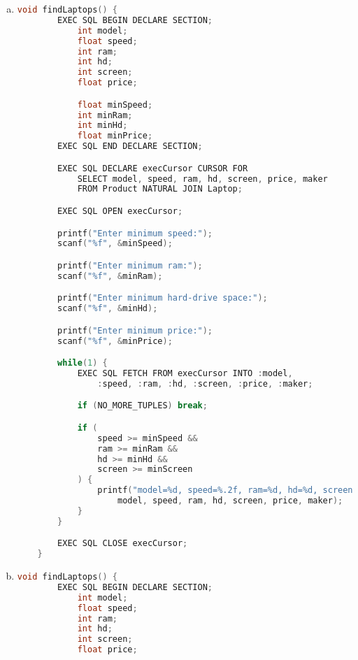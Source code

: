 \documentclass[12pt]{article}
\begin{document}
\begin{enumerate}[1.]
\begin{enumerate}[a)]
\begin{itemize}
\begin{itemize}
\begin{lstlisting}[language=c]
                ...
            }
        }
        \end{lstlisting}

            \end{itemize}
        \end{itemize}

        \item

    \begin{lstlisting}[language=c]
    void findLaptops() {
        EXEC SQL BEGIN DECLARE SECTION;
            int model;
            float speed;
            int ram;
            int hd;
            int screen;
            float price;

            float minSpeed;
            int minRam;
            int minHd;
            float minPrice;
        EXEC SQL END DECLARE SECTION;

        EXEC SQL DECLARE execCursor CURSOR FOR
            SELECT model, speed, ram, hd, screen, price, maker
            FROM Product NATURAL JOIN Laptop;

        EXEC SQL OPEN execCursor;

        printf("Enter minimum speed:");
        scanf("%f", &minSpeed);

        printf("Enter minimum ram:");
        scanf("%f", &minRam);

        printf("Enter minimum hard-drive space:");
        scanf("%f", &minHd);

        printf("Enter minimum price:");
        scanf("%f", &minPrice);

        while(1) {
            EXEC SQL FETCH FROM execCursor INTO :model,
                :speed, :ram, :hd, :screen, :price, :maker;

            if (NO_MORE_TUPLES) break;

            if (
                speed >= minSpeed &&
                ram >= minRam &&
                hd >= minHd &&
                screen >= minScreen
            ) {
                printf("model=%d, speed=%.2f, ram=%d, hd=%d, screen=%d, price=%.2f, maker=%c",
                    model, speed, ram, hd, screen, price, maker);
            }
        }

        EXEC SQL CLOSE execCursor;
    }
    \end{lstlisting}

        \item

    \begin{lstlisting}[language=c]
    void findLaptops() {
        EXEC SQL BEGIN DECLARE SECTION;
            int model;
            float speed;
            int ram;
            int hd;
            int screen;
            float price;


\end{lstlisting}
\end{enumerate}
\end{enumerate}
\end{document}
